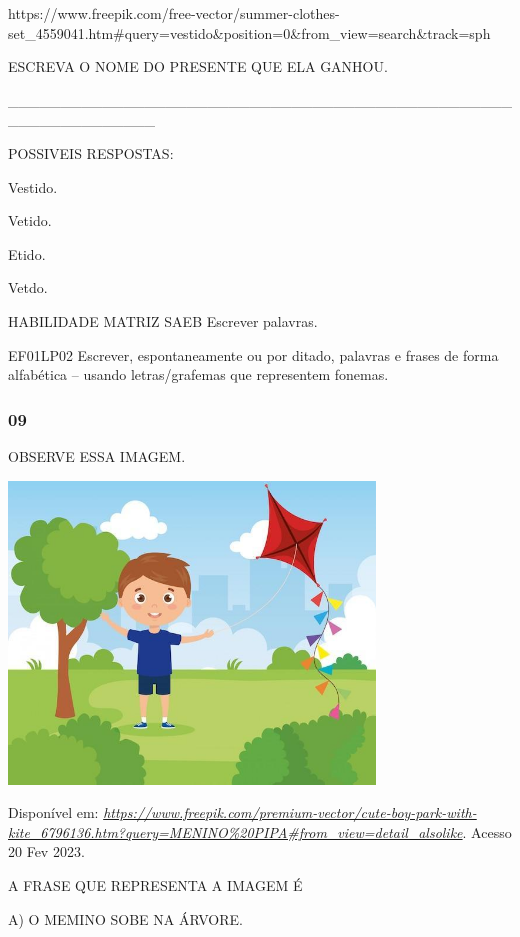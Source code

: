 https://www.freepik.com/free-vector/summer-clothes-set\_4559041.htm\#query=vestido\&position=0\&from\_view=search\&track=sph

ESCREVA O NOME DO PRESENTE QUE ELA GANHOU.

\_\_\_\_\_\_\_\_\_\_\_\_\_\_\_\_\_\_\_\_\_\_\_\_\_\_\_\_\_\_\_\_\_\_\_\_\_\_\_\_\_\_\_\_\_\_\_\_\_\_\_\_\_\_\_\_\_\_\_\_\_\_

POSSIVEIS RESPOSTAS:

Vestido.

Vetido.

Etido.

Vetdo.

HABILIDADE MATRIZ SAEB Escrever palavras.

EF01LP02 Escrever, espontaneamente ou por ditado, palavras e frases de
forma alfabética -- usando letras/grafemas que representem fonemas.

\subsubsection{09 }\label{section-65}

OBSERVE ESSA IMAGEM.

\includegraphics[width=3.84043in,height=3.16853in]{media/image233.jpg}

Disponível em:
\href{https://www.freepik.com/premium-vector/cute-boy-park-with-kite_6796136.htm?query=MENINO\%20PIPA\#from_view=detail_alsolike}{\emph{https://www.freepik.com/premium-vector/cute-boy-park-with-kite\_6796136.htm?query=MENINO\%20PIPA\#from\_view=detail\_alsolike}}.
Acesso 20 Fev 2023.

A FRASE QUE REPRESENTA A IMAGEM É

A) O MEMINO SOBE NA ÁRVORE.

